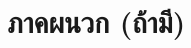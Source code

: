 \documentclass[11pt,a4paper]{article}
\begin{document}








\section{ภาคผนวก (ถ้ามี)}




\end{document}
